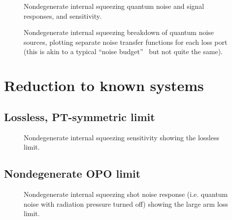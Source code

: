 \begin{figure}
	\centering
	\caption{Nondegenerate internal squeezing quantum noise and signal responses, and sensitivity.}
	\label{fig:}
\end{figure}

\begin{figure}
	\centering
	\caption{Nondegenerate internal squeezing breakdown of quantum noise sources, plotting separate noise transfer functions for each loss port (this is akin to a typical ``noise budget''~\cite{} but not quite the same).}
	\label{fig:}
\end{figure}


\section{Reduction to known systems}


\subsection{Lossless, PT-symmetric limit}

\begin{figure}
	\centering
	\caption{Nondegenerate internal squeezing sensitivity showing the lossless limit.}
	\label{fig:}
\end{figure}


\subsection{Nondegenerate OPO limit}
\begin{figure}
	\centering
	\caption{Nondegenerate internal squeezing shot noise response (i.e. quantum noise with radiation pressure turned off) showing the large arm loss limit.}
	\label{fig:}
\end{figure}


